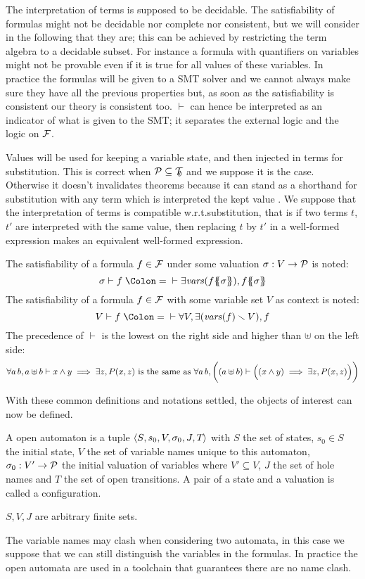 \documentclass{article}
\begin{document}
The interpretation of terms is supposed to be decidable.
The satisfiability of formulas might not be decidable nor complete nor consistent,
but we will consider in the following that they are; this can be achieved by restricting the term algebra to a decidable subset.
For instance a formula with quantifiers on variables might not be provable even if it is true for all values of these variables.
In practice the formulas will be given to a SMT solver and we cannot always make sure they have all the previous properties but, as soon as the satisfiability is consistent our theory is consistent too.
\(\vdash\) can hence be interpreted as an indicator of what is given to the SMT; it separates the external logic and the logic on \({\mathcal{F}}\).

Values will be used for keeping a variable state, and then injected in terms for substitution.
This is correct when \(\mathcal{P} \subseteq {\mathcal{T}}_{\!\!\emptyset}\) and we suppose it is the case.
Otherwise it doesn't invalidates theorems because it can stand as a shorthand for substitution with any term which is interpreted the kept value .
We suppose that the interpretation of terms is compatible w.r.t.\@ substitution, that is if two terms \(t\), \(t'\) are interpreted with the same value, then replacing \(t\) by \(t'\) in a well-formed expression makes an equivalent well-formed expression.
\begin{noti}
 The satisfiability of a formula \(f \in {\mathcal{F}}\) under some valuation \(\sigma: V \to \mathcal{P}\) is noted:
\[ \sigma \vdash f \defnotation \vdash \exists \fvars{f\psubst{\sigma}}, f\psubst{\sigma} \]
 The satisfiability of a formula \(f \in {\mathcal{F}}\) with some variable set \(V\) as context is noted:
\[ V \vdash f \defnotation \vdash \forall V, \exists\mpar{\fvars{f} \setminus V}, f \]
 The precedence of \(\vdash\) is the lowest on the right side and higher than \(\uplus\) on the left side:
\[ \forall a \, b, a \uplus b \vdash x \wedge y \implies \exists z, P{\left(x,z\right)} \text{ is the same as } \forall a \, b, \bigg((a \uplus b) \vdash \Big((x \wedge y) \implies \exists z, P{\left(x,z\right)}\Big)\bigg) \]
\end{noti}
With these common definitions and notations settled, the objects of interest can now be defined.
\begin{defi}
A open automaton is a tuple \(\left<S_{},s_{0},V_{},\sigma_{0},J_{},T_{}\right>\) with \(S\) the set of states, \(s_0 \in S\) the initial state, \(V\) the set of variable names unique to this automaton, \(\sigma_0: V' \to \mathcal{P}\) the initial valuation of variables where \(V' \subseteq V\), \(J\) the set of hole names and \(T\) the set of open transitions.
A pair of a state and a valuation is called a configuration.

\(S, V, J\) are arbitrary finite sets. %
\end{defi}
The variable names may clash when considering two automata, in this case we suppose that we can still distinguish the variables in the formulas.
In practice the open automata are used in a toolchain  that guarantees there are no name clash.
\end{document}
